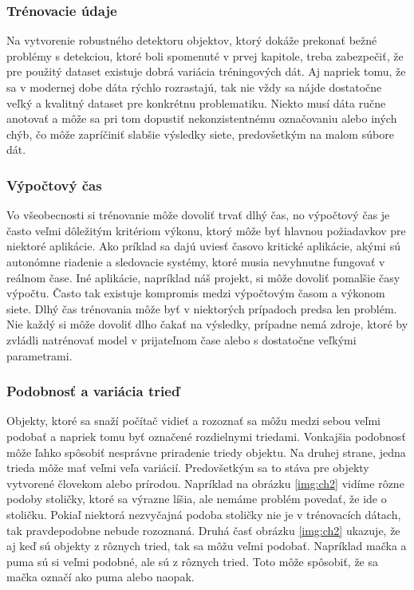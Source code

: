 \subsubsection{Trénovacie údaje}
Na vytvorenie robustného detektoru objektov, ktorý dokáže prekonať bežné problémy s detekciou, ktoré boli spomenuté v prvej kapitole, treba zabezpečiť, že pre použitý dataset existuje dobrá variácia tréningových dát. Aj napriek tomu, že sa v modernej dobe dáta rýchlo rozrastajú, tak nie vždy sa nájde dostatočne veľký a kvalitný dataset pre konkrétnu problematiku. Niekto musí dáta ručne anotovať a môže sa pri tom dopustiť nekonzistentnému označovaniu alebo iných chýb, čo môže zapríčiniť slabšie výsledky siete, predovšetkým na malom súbore dát.

\subsubsection{Výpočtový čas}
Vo všeobecnosti si trénovanie môže dovoliť trvať dlhý čas, no výpočtový čas je často veľmi dôležitým kritériom výkonu, ktorý môže byť hlavnou požiadavkov pre niektoré aplikácie. Ako príklad sa dajú uviesť časovo kritické aplikácie, akými sú autonómne riadenie a sledovacie systémy, ktoré musia nevyhnutne fungovať v reálnom čase. Iné aplikácie, napríklad náš projekt, si môže dovoliť pomalšie časy výpočtu. Často tak existuje kompromis medzi výpočtovým časom a výkonom siete. Dlhý čas trénovania môže byť v niektorých prípadoch predsa len problém. Nie každý si môže dovoliť dlho čakať na výsledky, prípadne nemá zdroje, ktoré by zvládli natrénovať model v prijateľnom čase alebo s dostatočne veľkými parametrami.

\subsubsection{Podobnosť a variácia trieď}
Objekty, ktoré sa snaží počítač vidieť a rozoznať sa môžu medzi sebou veľmi podobať a napriek tomu byť označené rozdielnymi triedami. Vonkajšia podobnosť môže ľahko spôsobiť nesprávne priradenie triedy objektu. Na druhej strane, jedna trieda môže mať veľmi veľa variácií. Predovšetkým sa to stáva pre objekty vytvorené človekom alebo prírodou. Napríklad na obrázku \ref{img:ch2} vidíme rôzne podoby stoličky, ktoré sa výrazne líšia, ale nemáme problém povedať, že ide o stoličku. Pokiaľ niektorá nezvyčajná podoba stoličky nie je v trénovacích dátach, tak pravdepodobne nebude rozoznaná. Druhá časť obrázku \ref{img:ch2} ukazuje, že aj keď sú objekty z rôznych tried, tak sa môžu veľmi podobať. Napríklad mačka a puma sú si veľmi podobné, ale sú z rôznych tried. Toto môže spôsobiť, že sa mačka označí ako puma alebo naopak.


